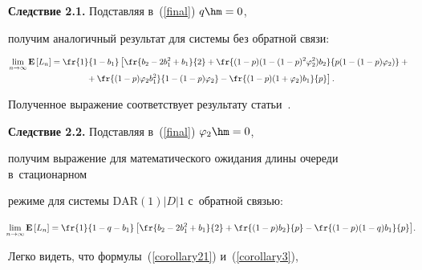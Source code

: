 \smallskip



\noindent

\textbf{Следствие 2.1.} Подставляя в~(\ref{final}) $q\hm=0$,

получим аналогичный результат для системы без обратной связи:



\vspace*{-2pt}



\noindent

\begin{multline*}

\lim\limits_{n\to\infty}\mathbf{E}\left[L_n\right]=

\fr{1}{1-b_1}\left[\fr{b_2-2b_1^2+b_1}{2}+\fr{(1-p)(1-(1-p)^2\varphi_2^2)b_2}

{p(1-(1-p)\varphi_2)}+{}\right.\\

\left.{}+\fr{(1-p)\varphi_2 b_1^2}{1-(1-p)\varphi_2}-

\fr{(1-p)(1+\varphi_2)b_1}{p}\right].

\end{multline*}

Полученное выражение соответствует результату статьи~\cite{3-u}.



\pagebreak



\noindent

\textbf{Следствие 2.2.} Подставляя в~(\ref{final}) $\varphi_2\hm=0$,

получим выражение для математического ожидания длины очереди в~стационарном

режиме для системы $\mathrm{DAR}\left(1\right)|D|1$ с~обратной связью:

\begin{equation}

\hspace*{-1mm}\lim\limits_{n\to\infty}\mathbf{E}\left[L_n\right]=

\fr{1}{1-q-b_1}\left[\fr{b_2-2b_1^2+b_1}{2}+\fr{(1-p)b_2}{p}-

\fr{(1-p)(1-q)b_1}{p}\right]\!.

\!\!\!

\label{corollary3}

\end{equation}

Легко видеть, что формулы~(\ref{corollary21}) и~(\ref{corollary3}),

